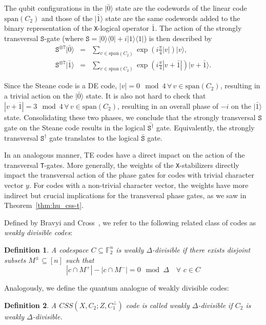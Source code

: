 \documentclass[journal]{IEEEtran}
\newcommand{\T}{\texttt{T}}
\newcommand{\X}{\texttt{X}}
\newtheorem{definition}{Definition}[section]
\begin{document}
The qubit configurations in the $|\bar{0}\rangle$ state are the codewords of the linear code $\textrm{span}(C_2)$ and those of the $|\bar{1}\rangle$ state are the same codewords added to the binary representation of the \X-logical operator $\bar{1}$. The action of the strongly transversal ${\texttt{S}}$-gate (where ${\texttt{S}}=|0\rangle\langle 0| + i|1\rangle\langle 1|$) is then described by 
\begin{eqnarray}
    \texttt{S}^{\otimes 7}|\bar{0}\rangle &=& \sum_{v\in \textrm{span}(C_2)} \exp\left( 
 i\frac{\pi}{4}|v|\right)|v\rangle, \\
   \texttt{S}^{\otimes 7} |\bar{1}\rangle &=& \sum_{v\in \textrm{span}(C_2)} \exp\left(
 i\frac{\pi}{4}|v+\bar{1}|\right)|v+\bar{1}\rangle
 .
\end{eqnarray}

Since the Steane code is a DE code,  $|v|=0\mod{4}\,\forall\,v\in \textrm{span}(C_2)$, resulting in a trivial action on the $|\bar{0}\rangle$ state. It is also not hard to check that $|v+\bar{1}|=3\mod{4}\,\forall\,v\in \textrm{span}(C_2)$, resulting in an overall phase of $-i$ on the $|\bar{1}\rangle$ state. Consolidating these two phases, we conclude that the strongly transversal $\texttt{S}$ gate on the Steane code results in the logical $\bar{\texttt{S}^\dagger}$ gate. Equivalently, the strongly transversal $\texttt{S}^\dagger$ gate translates to the logical $\bar{\texttt{S}}$ gate. 

In an analogous manner, TE codes have a direct impact on the action of the transversal \T-gates. More generally, the weights of the \X-stabilizers directly impact the transversal action of the phase gates for codes with trivial character vector $y$. For codes with a non-trivial character vector, the weights have more indirect but crucial implications for the transversal phase gates, as we saw in Theorem~\ref{thm:hu_css-t}.


Defined by Bravyi and Cross~\cite{bravyi_doubled_2015}, we refer to the following related class of codes as \textit{weakly divisible codes}:
\begin{definition}\label{def:gen_delta_div}
    A codespace $C \subseteq \mathbb{F}^n_2$ is weakly $\Delta$-divisible if there exists disjoint subsets $M^\pm\subseteq [n]$ such that 
    \begin{equation}
        |c\cap M^+|-|c\cap M^-|=0 \mod{\Delta} \quad \forall\,\, c\in C 
        \end{equation}
\end{definition}
Analogously, we define the quantum analogue of weakly divisible codes:
\begin{definition}\label{def:quantum_gen_delta_div}
   A $CSS(X,C_2;Z,C_1^\perp)$ code is called weakly $\Delta$-divisible if $C_2$ is weakly $\Delta$-divisible.
\end{definition}
\end{document}
